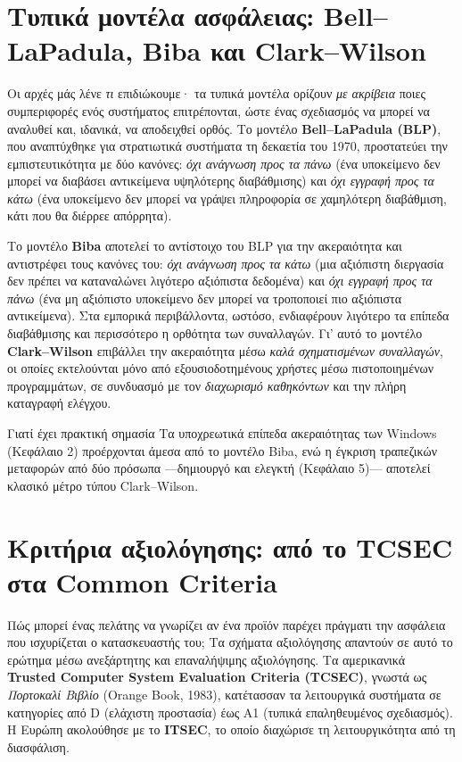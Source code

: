 \documentclass[11pt,openany]{book}
\begin{document}
\section{Τυπικά μοντέλα ασφάλειας: Bell–LaPadula, Biba και Clark–Wilson}\label{sec:1.7}
Οι αρχές μάς λένε \emph{τι} επιδιώκουμε· τα τυπικά μοντέλα ορίζουν \emph{με ακρίβεια} ποιες συμπεριφορές ενός συστήματος επιτρέπονται, ώστε ένας σχεδιασμός να μπορεί να αναλυθεί και, ιδανικά, να αποδειχθεί ορθός. Το μοντέλο \textbf{Bell–LaPadula (BLP)}, που αναπτύχθηκε για στρατιωτικά συστήματα τη δεκαετία του 1970, προστατεύει την εμπιστευτικότητα με δύο κανόνες: \emph{όχι ανάγνωση προς τα πάνω} (ένα υποκείμενο δεν μπορεί να διαβάσει αντικείμενα υψηλότερης διαβάθμισης) και \emph{όχι εγγραφή προς τα κάτω} (ένα υποκείμενο δεν μπορεί να γράψει πληροφορία σε χαμηλότερη διαβάθμιση, κάτι που θα διέρρεε απόρρητα).

Το μοντέλο \textbf{Biba} αποτελεί το αντίστοιχο του BLP για την ακεραιότητα και αντιστρέφει τους κανόνες του: \emph{όχι ανάγνωση προς τα κάτω} (μια αξιόπιστη διεργασία δεν πρέπει να καταναλώνει λιγότερο αξιόπιστα δεδομένα) και \emph{όχι εγγραφή προς τα πάνω} (ένα μη αξιόπιστο υποκείμενο δεν μπορεί να τροποποιεί πιο αξιόπιστα αντικείμενα). Στα εμπορικά περιβάλλοντα, ωστόσο, ενδιαφέρουν λιγότερο τα επίπεδα διαβάθμισης και περισσότερο η ορθότητα των συναλλαγών. Γι' αυτό το μοντέλο \textbf{Clark–Wilson} επιβάλλει την ακεραιότητα μέσω \emph{καλά σχηματισμένων συναλλαγών}, οι οποίες εκτελούνται μόνο από εξουσιοδοτημένους χρήστες μέσω πιστοποιημένων προγραμμάτων, σε συνδυασμό με τον \emph{διαχωρισμό καθηκόντων} και την πλήρη καταγραφή ελέγχου.

\begin{notebox}{Γιατί έχει πρακτική σημασία}
Τα υποχρεωτικά επίπεδα ακεραιότητας των Windows (Κεφάλαιο 2) προέρχονται άμεσα από το μοντέλο Biba, ενώ η έγκριση τραπεζικών μεταφορών από δύο πρόσωπα —δημιουργό και ελεγκτή (Κεφάλαιο 5)— αποτελεί κλασικό μέτρο τύπου Clark–Wilson.
\end{notebox}

\section{Κριτήρια αξιολόγησης: από το TCSEC στα Common Criteria}\label{sec:1.8}
Πώς μπορεί ένας πελάτης να γνωρίζει αν ένα προϊόν παρέχει πράγματι την ασφάλεια που ισχυρίζεται ο κατασκευαστής του; Τα σχήματα αξιολόγησης απαντούν σε αυτό το ερώτημα μέσω ανεξάρτητης και επαναλήψιμης αξιολόγησης. Τα αμερικανικά \textbf{Trusted Computer System Evaluation Criteria (TCSEC)}, γνωστά ως \emph{Πορτοκαλί Βιβλίο} (Orange Book, 1983), κατέτασσαν τα λειτουργικά συστήματα σε κατηγορίες από D (ελάχιστη προστασία) έως A1 (τυπικά επαληθευμένος σχεδιασμός). Η Ευρώπη ακολούθησε με το \textbf{ITSEC}, το οποίο διαχώρισε τη λειτουργικότητα από τη διασφάλιση.
\end{document}
